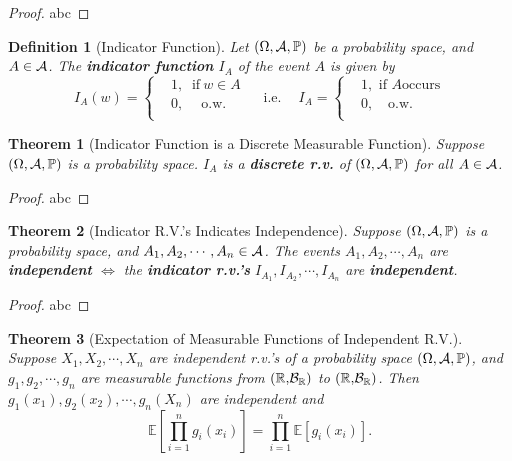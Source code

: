 \documentclass[openany,12pt]{book}
\newtheorem{theorem}{Theorem}[chapter]
\newtheorem{definition}{Definition}[chapter]
\begin{document}
\begin{proof}
  abc
\end{proof}

\begin{definition}[Indicator Function]
  Let $(\Omega,\mathcal{A},\mathbb{P})$ be a probability space, and $A \in \mathcal{A}$. The \textbf{indicator function} $I_{A}$ of the event $A$ is given by
  \[I_{A}(w)= \left\{ \begin{aligned}
       & 1, ~\text{ if}~ w \in A \\
       & 0,\quad ~\text{o.w.}~   \\
    \end{aligned} \right.\quad ~\text{i.e.}~\quad I_{A} = \left\{ \begin{aligned}
       & 1, \text{ if } A  \text{occurs} \\
       & 0,\quad \text{o.w.}             \\
    \end{aligned} \right.\]
\end{definition}

\begin{theorem}[Indicator Function is a Discrete Measurable Function]
  Suppose $(\Omega,\mathcal{A},\mathbb{P})$ is a probability space. $I_{A}$ is a \textbf{discrete r.v.} of $(\Omega,\mathcal{A},\mathbb{P})$ for all $A \in \mathcal{A}$.
\end{theorem}

\begin{proof}
  abc
\end{proof}

\begin{theorem}[Indicator R.V.'s Indicates Independence]
  Suppose $(\Omega,\mathcal{A},\mathbb{P})$ is a probability space, and $A_{1},A_{2}, \cdots,A_{n} \in \mathcal{A}$. The events $A_{1},A_{2}, \cdots,A_{n}$ are \textbf{independent} $\Leftrightarrow$ the \textbf{indicator r.v.'s}
  $I_{A_{1}},I_{A_{2}}, \cdots,I_{A_{n}}$ are \textbf{independent}.
\end{theorem}

\begin{proof}
  abc
\end{proof}

\begin{theorem}[Expectation of Measurable Functions of Independent R.V.]
  Suppose $X_{1}, X_{2}, \cdots,X_{n}$ are independent r.v.'s of a
  probability space $(\Omega,\mathcal{A},\mathbb{P})$, and $g_{1},g_{2}, \cdots,g_{n}$ are measurable functions from $\mathbb{(R,}\mathcal{B}_{\mathbb{R}})$ to
  $\mathbb{(R,}\mathcal{B}_{\mathbb{R}})$. Then $g_{1}(x_{1}),g_{2}(x_{2}), \cdots,g_{n}(X_{n})$ are independent and
  \[\mathbb{E}\left[ \prod_{i = 1}^{n}{g_{i}(x_{i})} \right] = \prod_{i = 1}^{n}{\mathbb{E}[ g_{i}(x_{i})]}.\]
\end{theorem}
\end{document}
